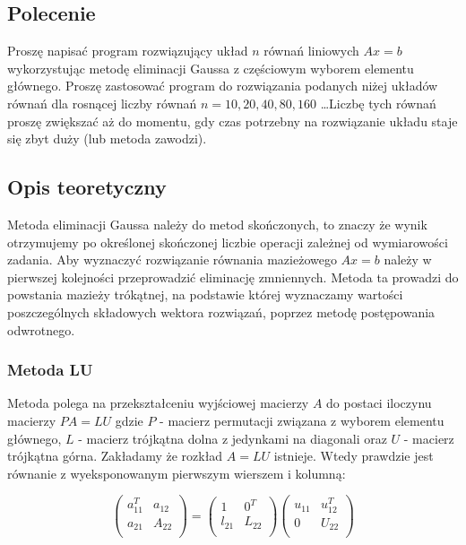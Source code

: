 \documentclass[a4paper, 11pt]{article}
\begin{document}
\subsection{Polecenie}
Proszę napisać program rozwiązujący układ $n$ równań liniowych $Ax = b$ wykorzystując metodę eliminacji Gaussa z częściowym wyborem elementu głównego. Proszę zastosować program do rozwiązania podanych niżej układów równań dla rosnącej liczby równań $n = 10, 20, 40, 80, 160$ \dots Liczbę tych równań proszę zwiększać aż do momentu, gdy czas potrzebny na rozwiązanie układu staje się zbyt duży (lub metoda zawodzi).

\subsection{Opis teoretyczny}
Metoda eliminacji Gaussa należy do metod skończonych, to znaczy że wynik otrzymujemy po określonej skończonej liczbie operacji zależnej od wymiarowości zadania. Aby wyznaczyć rozwiązanie równania mazieżowego $Ax = b$ należy w pierwszej kolejności przeprowadzić eliminację zmniennych. Metoda ta prowadzi do powstania mazieży trókątnej, na podstawie której wyznaczamy wartości poszczególnych składowych wektora rozwiązań, poprzez metodę postępowania odwrotnego.~\cite{third}

\subsubsection{Metoda LU}
Metoda polega na przekształceniu wyjściowej macierzy $A$ do postaci iloczynu macierzy $PA = LU$ gdzie $P$ - macierz permutacji związana z wyborem elementu głównego, $L$ - macierz trójkątna dolna z jedynkami na diagonali oraz $U$ - macierz trójkątna górna. Zakładamy że rozkład $A = LU$ istnieje. Wtedy prawdzie jest równanie z wyeksponowanym pierwszym wierszem i kolumną:

$$
\left( \begin{array}{ccc}
a_{11}^T & a_{12} \\
a_{21} & A_{22} \\
\end{array} \right)
=
\left( \begin{array}{ccc}
1 & 0^T \\
l_{21} & L_{22} \\
\end{array} \right)
\left( \begin{array}{ccc}
u_{11} & u_{12}^T \\
0 & U	_{22} \\
\end{array} \right)
$$
\end{document}
